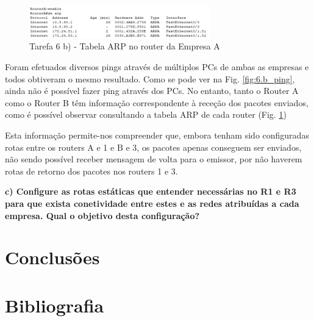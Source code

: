 \documentclass[11pt,english, openright, oneside]{book}
\newcommand\blankpage{%
    \null
    \thispagestyle{empty}%
    \newpage}
\begin{document}
\begin{figure}[H]
    \centering
    \includegraphics[width=0.7\textwidth]{imagens/Tarefa6/6.b_Router_ARP.png}
    \caption{Tarefa 6 b) - Tabela ARP no router da Empresa A}
    \label{fig:6.b_arp}
\end{figure}
\vspace{0.4cm}

Foram efetuados diversos pings através de múltiplos PCs de ambas as empresas e todos obtiveram o mesmo resultado. Como se pode ver na Fig. \ref{fig:6.b_ping}, ainda não é possível fazer ping através dos PCs. No entanto, tanto o Router A como o Router B têm informação correspondente à receção dos pacotes enviados, como é possível observar consultando a tabela ARP de cada router (Fig. \ref{fig:6.b_arp}) \par \vspace{0.2cm}

Esta informação permite-nos compreender que, embora tenham sido configuradas rotas entre os routers A e 1 e B e 3, os pacotes apenas conseguem ser enviados, não sendo possível receber mensagem de volta para o emissor, por não haverem rotas de retorno dos pacotes nos routers 1 e 3. \par \vspace{0.2cm}

\vspace{0.8cm}

\pagebreak
\textbf{c) Configure as rotas estáticas que entender necessárias no R1 e R3 para que exista conetividade entre estes e as redes atribuídas a cada empresa. Qual o objetivo desta configuração?}
\vspace{0.2cm}



\vspace{0.8cm}


\chapter{Conclusões}



\chapter{Bibliografia}



\mainmatter



\afterpage{\blankpage}
\end{document}
